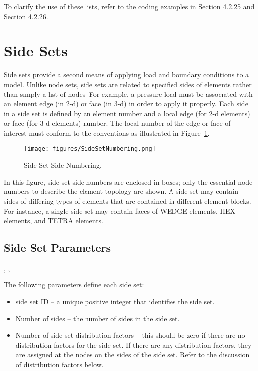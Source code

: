 To clarify the use of these lists, refer to the coding examples
in  Section 4.2.25 and  Section 4.2.26.

\section{Side Sets}

Side sets provide a second means of applying load and boundary
conditions to a model. Unlike node sets, side sets are related to
specified sides of elements rather than simply a list of nodes. For
example, a pressure load must be associated with an element edge (in
2-d) or face (in 3-d) in order to apply it properly. Each side in a
side set is defined by an element number and a local edge (for 2-d
elements) or face (for 3-d elements) number. The local number of the
edge or face of interest must conform to the conventions as
illustrated in Figure~\ref{f:SideSetNumbering}.
\begin{figure}[htbp]
\begin{center}
\texttt{[image: figures/SideSetNumbering.png]}
\caption{Side Set Side Numbering.}\label{f:SideSetNumbering}
\end{center}
\end{figure}

 In this figure, side set side numbers are enclosed in boxes; only the
 essential node numbers to describe the element topology are shown. A
 side set may contain sides of differing types of elements that are
 contained in different element blocks. For instance, a single side
 set may contain faces of WEDGE elements, HEX elements, and TETRA
 elements.



\subsection{Side Set Parameters}



\begin{spacing}{1.5}
\api {}, , 
\end{spacing}

{The following parameters define each side set:}

\begin{itemize}
 \item {side set ID -- a unique positive integer that identifies the
 side set.}

 \item {Number of sides -- the number of sides in the side
set.}

 \item {Number of side set distribution factors -- this should be zero
 if there are no distribution factors for the side set. If there are
 any distribution factors, they are assigned at the nodes on the sides
 of the side set. Refer to the discussion of distribution factors
 below.}
\end{itemize}


